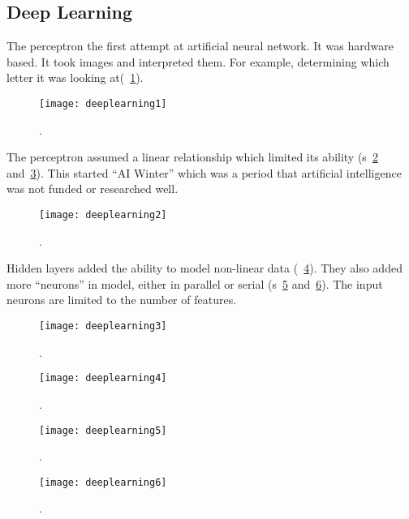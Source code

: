 	\subsection{Deep Learning}

The perceptron the first attempt at artificial neural network.  It was hardware based.  It took images and interpreted them.  For example, determining which letter it was looking at(\figurename~\ref{fig:deeplearning1}).
 	\begin{figure}[h]
		\centering
		\texttt{[image: deeplearning1]}
		\caption{.}
		\label{fig:deeplearning1}
	\end{figure}

The perceptron assumed a linear relationship which limited its ability (\figurename{}s~\ref{fig:deeplearning2} and~\ref{fig:deeplearning3}).  This started ``AI Winter'' which was a period that artificial intelligence was not funded or researched well.

 	\begin{figure}[tbh]
		\centering
		\texttt{[image: deeplearning2]}
		\caption{.}
		\label{fig:deeplearning2}
	\end{figure}

Hidden layers added the ability to model non-linear data (\figurename~\ref{fig:deeplearning4}).  They also added more ``neurons'' in model, either in parallel or serial (\figurename{}s~\ref{fig:deeplearning5} and~\ref{fig:deeplearning6}).  The input neurons are limited to the number of features.

 	\begin{figure}[h]
		\centering
		\texttt{[image: deeplearning3]}
		\caption{.}
		\label{fig:deeplearning3}
	\end{figure}

 	\begin{figure}[h]
		\centering
		\texttt{[image: deeplearning4]}
		\caption{.}
		\label{fig:deeplearning4}
	\end{figure}

 	\begin{figure}[h]
		\centering
		\texttt{[image: deeplearning5]}
		\caption{.}
		\label{fig:deeplearning5}
	\end{figure}

 	\begin{figure}[h]
		\centering
		\texttt{[image: deeplearning6]}
		\caption{.}
		\label{fig:deeplearning6}
	\end{figure}

